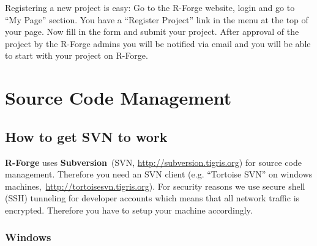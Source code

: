 \documentclass[a4paper]{article}
\begin{document}
Registering a new project is easy: Go to the R-Forge website, login and
go to ``My Page'' section. You have a ``Register Project'' link in the
menu at the top of your page. Now fill in the form and submit your
project. After approval of the project by the R-Forge admins  you will
be notified via email and you will be able to start with your project
on R-Forge.

\section{Source Code Management}
\label{sec:scm}

\subsection{How to get SVN to work}
\label{sec:scmhowto}

\textbf{R-Forge} uses
\textbf{Subversion}~(SVN, \url{http://subversion.tigris.org}) for
source code management.
Therefore you need an SVN client (e.g. ``Tortoise SVN'' on
windows machines,~\url{http://tortoisesvn.tigris.org}). For security
reasons we use secure shell (SSH) tunneling for
developer accounts which means that all network traffic is
encrypted. Therefore you have to setup your machine accordingly.

\subsubsection{Windows}
\end{document}
